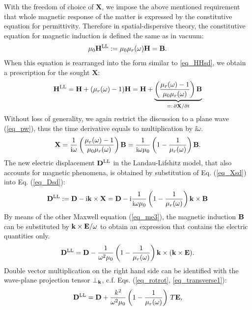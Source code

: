 With the freedom of choice of $\mathbf{X}$, we impose the above mentioned requirement that whole magnetic response of the matter is expressed by the constitutive equation for permittivity. Therefore in spatial-dispersive theory, the constitutive equation %
for magnetic induction is defined the same as in vacuum:
\begin{equation} \mu_0 {\mathbf{H}^\text{LL}} := \mu_0 \mu_r(\omega) \mathbf{H} = \mathbf{B}. \label{eq_mu_sd}\end{equation}
When this equation is rearranged into the form similar to \ref{eq_HHsd}, we obtain a prescription for the sought $\mathbf{X}$: 
$$ {\mathbf{H}^\text{LL}} = \mathbf{H} + (\mu_r(\omega) -1)\mathbf{H} = \mathbf{H} + \underbrace{\left(\frac{\mu_r(\omega)-1}{\mu_0\mu_r(\omega)}\right)\mathbf{B}}_{=:\,\partial\mathbf{X}/\partial t}$$
Without loss of generality, we again restrict the discussion to a plane wave (\ref{eq_pw}), thus the time derivative equals to multiplication by $\ii\omega$.
\begin{equation} \mathbf{X} = \frac{1}{{\mathrm i}\omega}\left(\frac{\mu_r(\omega)-1}{\mu_0\mu_r(\omega)}\right)\mathbf{B} = \frac{1}{{\mathrm i}\omega\mu_0}\left(1 - \frac{1}{\mu_r(\omega)}\right)\mathbf{B}. \label{eq_Xsd}\end{equation}
The new electric displacement ${\mathbf{D}^\text{LL}}$ in the  Landau-Lifshitz model, that also accounts for magnetic phenomena, is obtained by substitution of Eq. (\ref{eq_Xsd}) into Eq. (\ref{eq_Dsd}):
\begin{equation} {\mathbf{D}^\text{LL}} := \mathbf{D} - {\mathrm i}{\mathbf{k}}\times \mathbf{X} =  \mathbf{D} - {\mathrm i}  \frac{1}{{\mathrm i}\omega\mu_0}\left(1 - \frac{1}{\mu_r(\omega)}\right) {\mathbf{k}}\times \mathbf{B}  \label{eq_Dsd2}\end{equation}
By means of the other Maxwell equation (\ref{eq_me3}), the magnetic induction $\mathbf{B}$ can be substituted by ${\mathbf{k}}\times\mathbf{E} / \omega$ to obtain an expression that contains the electric quantities only.
\begin{equation} {\mathbf{D}^\text{LL}} = \mathbf{D} - \frac{1}{\omega^2 \mu_0}\left(1 - \frac{1}{\mu_r(\omega)}\right) {\mathbf{k}}\times({\mathbf{k}}\times \mathbf{E}).  \label{eq_Dsd3}\end{equation} 
Double vector multiplication on the right hand side can be identified with the wave-plane projection tensor $\perp_{\mathbf{k}}$, c.f. Eqs. (\ref{eq_rotrot}, \ref{eq_transverse1}):
\begin{equation} {\mathbf{D}^\text{LL}} = \mathbf{D} + \frac{k^2}{\omega^2 \mu_0}\left(1 - \frac{1}{\mu_r(\omega)}\right) \, T \mathbf{E},  \label{eq_Dsd4}\end{equation} 


